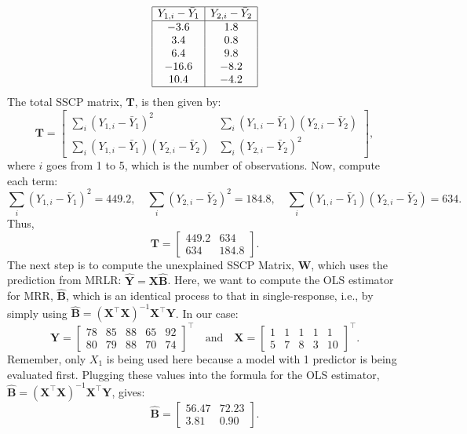\documentclass[11pt]{report} %
\begin{document}
\[
\begin{array}{|c|c|c|}
\hline
Y_{1,i} - \bar{Y}_1 & Y_{2,i} - \bar{Y}_2 \\
\hline
-3.6  & 1.8  \\
3.4   & 0.8   \\
6.4   & 9.8   \\
-16.6 & -8.2 \\
10.4  & -4.2  \\
\hline
\end{array}
\]
The total SSCP matrix, \(\mathbf{T}\), is then given by:
\[
\mathbf{T} =
\begin{bmatrix}
\sum_i (Y_{1,i} - \bar{Y}_1)^2 & \sum_i (Y_{1,i} - \bar{Y}_1)(Y_{2,i} - \bar{Y}_2) \\
\sum_i (Y_{1,i} - \bar{Y}_1)(Y_{2,i} - \bar{Y}_2) & \sum_i (Y_{2,i} - \bar{Y}_2)^2
\end{bmatrix},
\]
where $i$ goes from 1 to 5, which is the number of observations. Now, compute each term:
\[
\sum_i (Y_{1,i} - \bar{Y}_1)^2 = 449.2, \quad
\sum_i (Y_{2,i} - \bar{Y}_2)^2 = 184.8, \quad
\sum_i (Y_{1,i} - \bar{Y}_1)(Y_{2,i} - \bar{Y}_2) = 634.
\]
Thus,
\[
\mathbf{T} =
\begin{bmatrix}
449.2 & 634 \\
634 & 184.8
\end{bmatrix}.
\]
The next step is to compute the unexplained SSCP Matrix, \(\mathbf{W}\), which uses the prediction from MRLR: $\hat{\mathbf{Y}} = \mathbf{X}\hat{\mathbf{B}}$. Here, we want to compute the OLS estimator for MRR, $\mathbf{\hat{B}}$, which is an identical process to that in single-response, i.e., by simply using $\mathbf{\hat{B}} = (\mathbf{X}^\top\mathbf{X})^{-1}\mathbf{X}^\top\mathbf{Y}$. In our case:
\[
\mathbf{Y} =
\begin{bmatrix}
78 & 85 & 88 & 65 & 92 \\
80 & 79 & 88 & 70 & 74
\end{bmatrix}^\top 
\quad \text{and} \quad
\mathbf{X} =
\begin{bmatrix}
1 & 1 & 1 & 1 & 1 \\
5 & 7 & 8 & 3 & 10
\end{bmatrix}^\top.
\]
Remember, only $X_1$ is being used here because a model with 1 predictor is being evaluated first. Plugging these values into the formula for the OLS estimator, $\hat{\mathbf{B}} = (\mathbf{X}^\top\mathbf{X})^{-1}\mathbf{X}^\top \mathbf{Y}$, gives:
\[
\mathbf{\hat{B}} =
\begin{bmatrix}
56.47 & 72.23 \\
3.81 & 0.90
\end{bmatrix}.
\]
\end{document}
